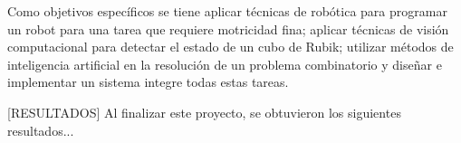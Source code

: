 Como objetivos específicos se tiene aplicar técnicas de robótica para programar un robot para una tarea que requiere motricidad fina; aplicar técnicas de visión computacional para detectar el estado de un cubo de Rubik; utilizar métodos de inteligencia artificial en la resolución de un problema combinatorio y diseñar e implementar un sistema integre todas estas tareas.

[RESULTADOS]
Al finalizar este proyecto, se obtuvieron los siguientes resultados...
